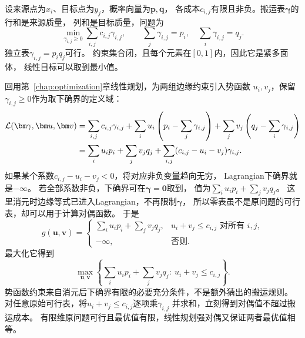 设来源点为\(x_i\)、目标点为\(y_j\)，概率向量为\(\bm p,\bm q\)，
各成本\(c_{i,j}\)有限且非负。搬运表\(\bm\gamma\)的行和是来源质量，
列和是目标质量，问题为
\[
  \min_{\gamma_{i,j}\geq0}\sum_{i,j}c_{i,j}\gamma_{i,j},
  \qquad \sum_j\gamma_{i,j}=p_i,\quad\sum_i\gamma_{i,j}=q_j.
\]
独立表\(\gamma_{i,j}=p_iq_j\)可行。
约束集合闭，且每个元素在\([0,1]\)内，因此它是紧多面体，
线性目标可以取到最小值。

回用第~\ref{chap:optimization}章线性规划，为两组边缘约束引入势函数
\(u_i,v_j\)，保留\(\gamma_{i,j}\geq0\)作为取下确界的定义域：
\begin{align}
  \mathcal L(\bm\gamma,\bm u,\bm v)
  &=\sum_{i,j}c_{i,j}\gamma_{i,j}
    +\sum_i u_i\left(p_i-\sum_j\gamma_{i,j}\right)
    +\sum_j v_j\left(q_j-\sum_i\gamma_{i,j}\right)\notag\\
  &=\sum_i u_ip_i+\sum_jv_jq_j
    +\sum_{i,j}(c_{i,j}-u_i-v_j)\gamma_{i,j}.
  \label{eq:information-discrete-ot-lagrangian}
\end{align}
如果某个系数\(c_{i,j}-u_i-v_j<0\)，将对应非负变量趋向无穷，
Lagrangian下确界就是\(-\infty\)。
若全部系数非负，下确界可在\(\bm\gamma=\bm0\)取到，
值为\(\sum_i u_ip_i+\sum_jv_jq_j\)。
这里消元时边缘等式已进入Lagrangian，不再限制\(\bm\gamma\)，
所以零表虽不是原问题的可行表，却可以用于计算对偶函数。
于是
\[
  g(\bm u,\bm v)=
  \begin{cases}
    \sum_i u_ip_i+\sum_jv_jq_j,&u_i+v_j\leq c_{i,j}\text{ 对所有 }i,j,\\
    -\infty,&\text{否则}.
  \end{cases}
\]
最大化它得到
\begin{equation}
  \max_{\bm u,\bm v}
  \left\{\sum_i u_ip_i+\sum_jv_jq_j:\ u_i+v_j\leq c_{i,j}\right\}.
  \label{eq:information-discrete-ot-dual}
\end{equation}
势函数约束来自消元后下确界有限的必要充分条件，不是额外猜出的搬运规则。
对任意原始可行表，将\(u_i+v_j\leq c_{i,j}\)逐项乘\(\gamma_{i,j}\)
并求和，立刻得到对偶值不超过搬运成本。
有限维原问题可行且最优值有限，线性规划强对偶又保证两者最优值相等。


